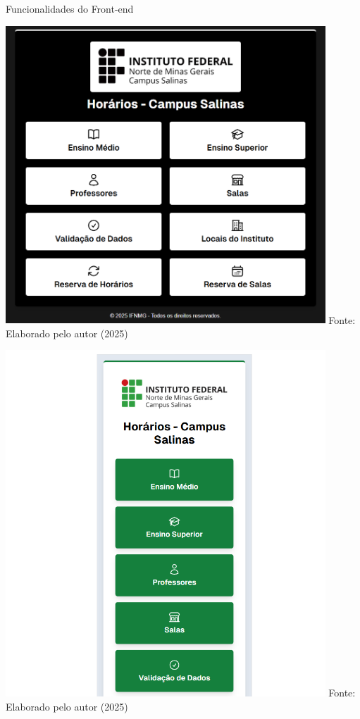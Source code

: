 \begin{frame}{Funcionalidades do Front-end}
  \begin{minipage}{0.48\textwidth}
    \centering
    \includegraphics[width=0.9\textwidth]{figuras/front-15.png}
    \small Fonte: Elaborado pelo autor (2025)
  \end{minipage}
  \hfill
  \begin{minipage}{0.48\textwidth}
    \centering
    \includegraphics[width=0.9\textwidth]{figuras/front-16.png}
    \small Fonte: Elaborado pelo autor (2025)
  \end{minipage}
\end{frame}

